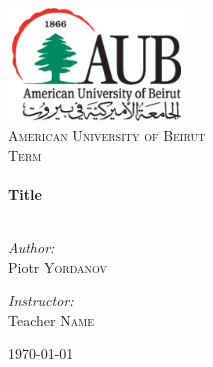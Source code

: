 \begin{titlepage}

\begin{center}

\includegraphics[width=0.35\textwidth]{./logo.png}\\[1cm]    


\textsc{\LARGE American University of Beirut}\\[1.5cm]

\textsc{\Large Term}\\[0.5cm]


\HRule \\[0.4cm]
{ \huge \bfseries Title}\\[0.4cm]

\HRule \\[1.5cm]

\begin{minipage}{0.4\textwidth}
\begin{flushleft} \large
\emph{Author:}\\
Piotr \textsc{Yordanov}
\end{flushleft}
\end{minipage}
\begin{minipage}{0.4\textwidth}
\begin{flushright} \large
\emph{Instructor:} \\
Teacher \textsc{Name}
\end{flushright}
\end{minipage}

\vfill

{\large \today}

\end{center}

\end{titlepage}
